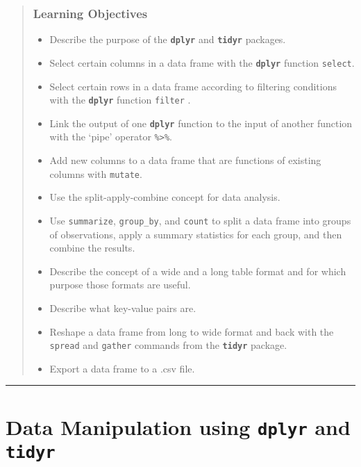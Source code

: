 \documentclass[]{article}
\providecommand{\tightlist}{%
  \setlength{\itemsep}{0pt}\setlength{\parskip}{0pt}}
\begin{document}
\begin{quote}
\subsubsection{Learning Objectives}\label{learning-objectives}

\begin{itemize}
\tightlist
\item
  Describe the purpose of the \textbf{\texttt{dplyr}} and
  \textbf{\texttt{tidyr}} packages.
\item
  Select certain columns in a data frame with the
  \textbf{\texttt{dplyr}} function \texttt{select}.
\item
  Select certain rows in a data frame according to filtering conditions
  with the \textbf{\texttt{dplyr}} function \texttt{filter} .
\item
  Link the output of one \textbf{\texttt{dplyr}} function to the input
  of another function with the `pipe' operator
  \texttt{\%\textgreater{}\%}.
\item
  Add new columns to a data frame that are functions of existing columns
  with \texttt{mutate}.
\item
  Use the split-apply-combine concept for data analysis.
\item
  Use \texttt{summarize}, \texttt{group\_by}, and \texttt{count} to
  split a data frame into groups of observations, apply a summary
  statistics for each group, and then combine the results.
\item
  Describe the concept of a wide and a long table format and for which
  purpose those formats are useful.
\item
  Describe what key-value pairs are.
\item
  Reshape a data frame from long to wide format and back with the
  \texttt{spread} and \texttt{gather} commands from the
  \textbf{\texttt{tidyr}} package.
\item
  Export a data frame to a .csv file.
\end{itemize}
\end{quote}

\begin{center}\rule{0.5\linewidth}{\linethickness}\end{center}

\section{\texorpdfstring{Data Manipulation using \textbf{\texttt{dplyr}}
and
\textbf{\texttt{tidyr}}}{Data Manipulation using dplyr and tidyr}}\label{data-manipulation-using-dplyr-and-tidyr}
\end{document}
